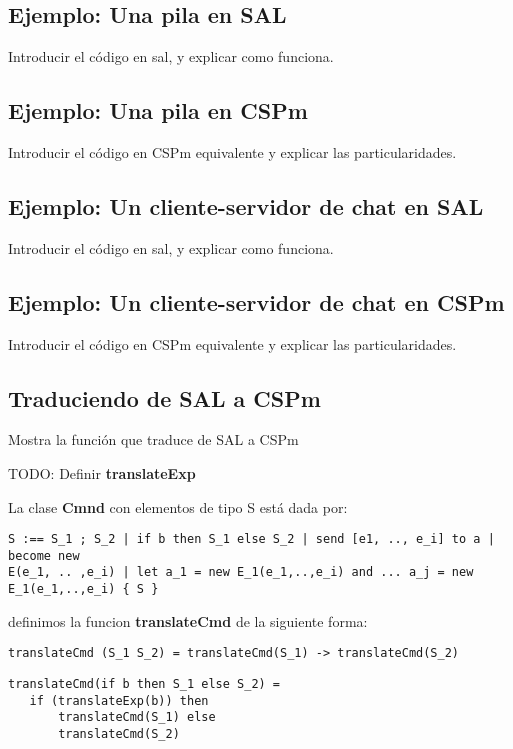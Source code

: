 \documentclass[fleqn]{article}
\begin{document}
\subsection{Ejemplo: Una pila en SAL}

Introducir el código en sal, y explicar como funciona.

\subsection{Ejemplo: Una pila en CSPm}

Introducir el código en CSPm equivalente y explicar las particularidades.

\subsection{Ejemplo: Un cliente-servidor de chat en SAL}

Introducir el código en sal, y explicar como funciona.

\subsection{Ejemplo: Un cliente-servidor de chat en CSPm}

Introducir el código en CSPm equivalente y explicar las particularidades.

\subsection{Traduciendo de SAL a CSPm}

Mostra la función que traduce de SAL a CSPm


TODO: Definir \textbf{translateExp}

La clase \textbf{Cmnd} con elementos de tipo S está dada por:

\begin{verbatim}
S :== S_1 ; S_2 | if b then S_1 else S_2 | send [e1, .., e_i] to a | become new
E(e_1, .. ,e_i) | let a_1 = new E_1(e_1,..,e_i) and ... a_j = new
E_1(e_1,..,e_i) { S } 
\end{verbatim}

definimos la funcion \textbf{translateCmd} de la siguiente forma:

\begin{verbatim}
translateCmd (S_1 S_2) = translateCmd(S_1) -> translateCmd(S_2)
\end{verbatim}


\begin{verbatim}
translateCmd(if b then S_1 else S_2) = 
   if (translateExp(b)) then
       translateCmd(S_1) else 
       translateCmd(S_2)
\end{verbatim}
\end{document}
